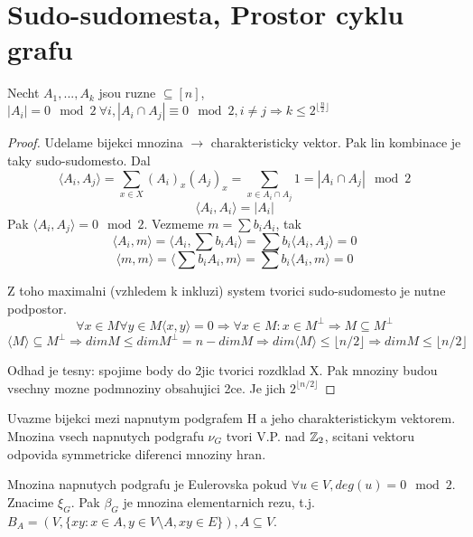 \section{\texorpdfstring{Sudo-sudomesta, Prostor cyklu grafu}{Sudo-sudomesta, Prostor cyklu grafu}}
\vspace{5mm}
\large

\begin{theorem}
	Necht $A_1, ... , A_k$ jsou ruzne $ \subseteq [n]$, $ |A_i| = 0 \mod2 \ \forall i, |A_i \cap A_j| \equiv 0 \mod2, i \ne j \Rightarrow k \leq 2^{\lfloor \frac{n}{2} \rfloor }$
\end{theorem}
\begin{proof}
	Udelame bijekci mnozina $\to$ charakteristicky vektor. Pak lin kombinace je taky sudo-sudomesto. Dal
	\[ \langle A_i, A_j \rangle = \sum_{x \in X} (A_i)_x (A_j)_x = \sum_{x \in A_i \cap A_j} 1 = |A_i \cap A_j| \mod2 \]
	\[ \langle A_i, A_i \rangle = |A_i| \]
	Pak $ \langle A_i, A_j \rangle = 0 \mod2 $. Vezmeme $ m = \sum b_iA_i $, tak
	\[ \langle A_i, m \rangle = \langle A_i, \sum b_iA_i \rangle = \sum b_i \langle A_i, A_j \rangle = 0 \]
	\[ \langle m,m \rangle = \langle \sum b_iA_i, m \rangle = \sum b_i \langle A_i, m \rangle = 0 \]

	Z toho maximalni (vzhledem k inkluzi) system tvorici sudo-sudomesto je nutne podpostor.
	\[ \forall x \in M \forall y \in M \langle x, y \rangle = 0 \Rightarrow \forall x \in M: x \in M^{\perp} \Rightarrow M \subseteq M^{\perp} \]
	\[ \langle M \rangle \subseteq M^{\perp} \Rightarrow dim M \leq dim M^{\perp} = n - dim M \Rightarrow dim \langle M \rangle \leq \lfloor n/2 \rfloor \Rightarrow dim M \leq \lfloor n/2 \rfloor \]

	Odhad je tesny: spojime body do 2jic tvorici rozdklad X. Pak mnoziny budou vsechny mozne podmnoziny obsahujici 2ce. Je jich $ 2^{\lfloor n/2 \rfloor} $
\end{proof}


\begin{definition}
Uvazme bijekci mezi napnutym podgrafem H a jeho charakteristickym vektorem. Mnozina vsech napnutych podgrafu $\nu_G$ tvori V.P. nad $\operatorname{\mathbb{Z}}_2$, scitani vektoru odpovida symmetricke diferenci mnoziny hran.
\end{definition}
\begin{definition}
	Mnozina napnutych podgrafu je Eulerovska pokud $\forall u \in V, deg(u) = 0 \mod2$. Znacime $\xi_G$. Pak $\beta_G$ je mnozina elementarnich rezu, t.j. $B_A = (V, \{xy: x \in A, y\in V\setminus A, xy\in E\}), A \subseteq V$.
\end{definition}

